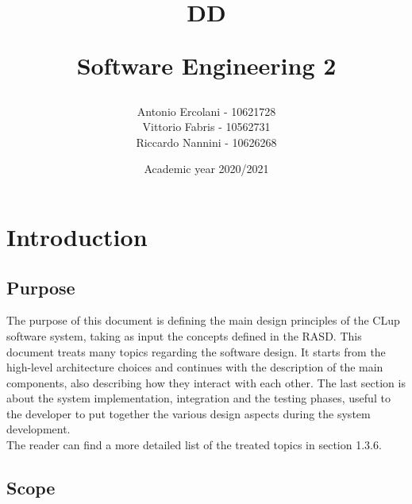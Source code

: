\documentclass[]{article}
\title{ DD \\
	\begin{large} 
		Software Engineering 2
	\end{large}}
\author{Antonio Ercolani - 10621728\\Vittorio Fabris - 10562731\\Riccardo Nannini - 10626268}
\date{Academic year 2020/2021}
\begin{document}
	
	\maketitle
	

	\newpage


	\tableofcontents
	
	\newpage
	
	
	\section{Introduction}
	
	\subsection{Purpose}
	The purpose of this document is defining the main design principles of the CLup software system, taking as input the concepts defined in the RASD. This document treats many topics regarding the software design. It starts from the high-level architecture choices and continues with the description of the main components, also describing how they interact with each other. The last section is about the system implementation, integration and the testing phases, useful to the developer to put together the various design aspects during the system development. 
	\\The reader can find a more detailed list of the treated topics in section 1.3.6.
	
	
	\subsection{Scope}
	
\end{document}
